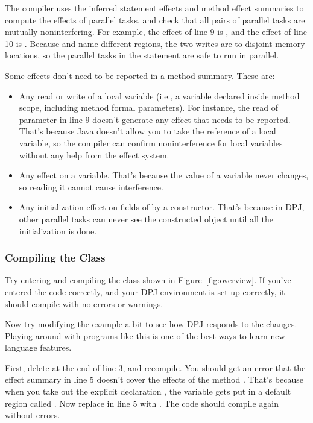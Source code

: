 The compiler uses the inferred statement effects and method effect
summaries to compute the effects of parallel tasks, and check that all
pairs of parallel tasks are mutually noninterfering.  For example, the
effect of line 9 is , and the effect of line 10 is
.  Because  and  name different regions,
the two writes are to disjoint memory locations, so the parallel tasks
in the  statement are safe to run in parallel.  

Some effects don't need to be reported in a method summary.  These
are:
%
\begin{itemize}
%
\item Any read or write of a local variable (i.e., a variable declared
  inside method scope, including method formal parameters).  For
  instance, the read of parameter  in line 9 doesn't generate
  any effect that needs to be reported.  That's because Java doesn't
  allow you to take the reference of a local variable, so the compiler
  can confirm noninterference for local variables without any help
  from the effect system.
%
\item Any effect on a  variable.  That's because the value
  of a  variable never changes, so reading it cannot cause
  interference.
%
\item Any initialization effect on fields of  by a
  constructor.  That's because in DPJ, other parallel tasks can never
  see the constructed object until all the initialization is done.
%
\end{itemize}

\subsubsection{Compiling the  Class%
\label{sec:overview:basic:compiling}}

Try entering and compiling the  class shown in
Figure~\ref{fig:overview}.  If you've entered the code correctly, and
your DPJ environment is set up correctly, it should compile with no
errors or warnings.

Now try modifying the example a bit to see how DPJ responds to the
changes.  Playing around with programs like this is one of the best
ways to learn new language features.

First, delete  at the end of line 3, and recompile.  You
should get an error that the effect summary  in line 5
doesn't cover the effects of the method .  That's because
when you take out the explicit declaration , the variable
 gets put in a default region called .  Now replace
 in line 5 with .  The code should
compile again without errors.

